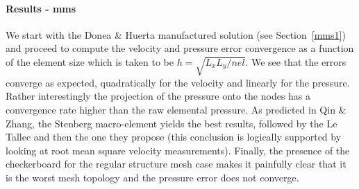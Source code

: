 \paragraph{Results - mms}

We start with the Donea \& Huerta manufactured solution (see Section~\ref{mms1}) and 
proceed to compute the velocity and pressure error convergence as a function of the 
element size which is taken to be $h = \sqrt{L_xL_y/nel}$. We see that 
the errors converge as expected, quadratically for the velocity and linearly for the pressure.
Rather interestingly the projection of the pressure onto the nodes has a convergence rate 
higher than the raw elemental pressure. As predicted in Qin \& Zhang, the Stenberg macro-element 
yields the best results, followed by the Le Tallec and then the one they propose (this conclusion 
is logically supported by looking at root mean square velocity measurements). 
Finally, the presence of the checkerboard for the regular structure mesh case
makes it painfully clear that it is the worst mesh topology 
and the pressure error does not converge.  

